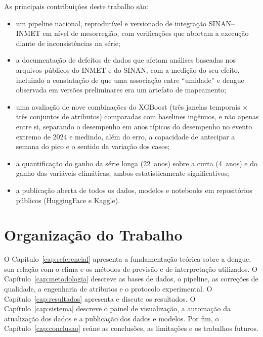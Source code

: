 As principais contribuições deste trabalho são:

\begin{itemize}
    \item um pipeline nacional, reprodutível e versionado de integração SINAN--INMET em nível de mesorregião, com verificações que abortam a execução diante de inconsistências na série;
    \item a documentação de defeitos de dados que afetam análises baseadas nos arquivos públicos do INMET e do SINAN, com a medição do seu efeito, incluindo a constatação de que uma associação entre ``umidade'' e dengue observada em versões preliminares era um artefato de mapeamento;
    \item uma avaliação de nove combinações do XGBoost (três janelas temporais $\times$ três conjuntos de atributos) comparadas com baselines ingênuos, e não apenas entre si, separando o desempenho em anos típicos do desempenho no evento extremo de 2024 e medindo, além do erro, a capacidade de antecipar a semana do pico e o sentido da variação dos casos;
    \item a quantificação do ganho da série longa (22~anos) sobre a curta (4~anos) e do ganho das variáveis climáticas, ambos estatisticamente significativos;
    \item a publicação aberta de todos os dados, modelos e notebooks em repositórios públicos (HuggingFace e Kaggle).
\end{itemize}

\section{Organização do Trabalho}

O Capítulo~\ref{cap:referencial} apresenta a fundamentação teórica sobre a dengue, sua relação com o clima e os métodos de previsão e de interpretação utilizados. O Capítulo~\ref{cap:metodologia} descreve as bases de dados, o pipeline, as correções de qualidade, a engenharia de atributos e o protocolo experimental. O Capítulo~\ref{cap:resultados} apresenta e discute os resultados. O Capítulo~\ref{cap:sistema} descreve o painel de visualização, a automação da atualização dos dados e a publicação dos dados e modelos. Por fim, o Capítulo~\ref{cap:conclusao} reúne as conclusões, as limitações e os trabalhos futuros.
